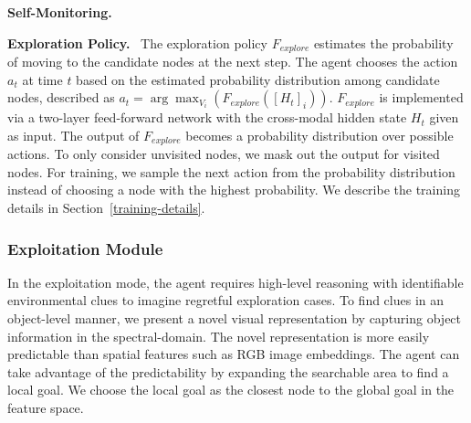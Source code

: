 \documentclass[10pt,twocolumn,letterpaper]{article}
\begin{document}
\noindent\textbf{Self-Monitoring.}
\font=2.5pt

\font=2.2pt
\noindent\textbf{Exploration Policy.}~\label{exploration-policy} The exploration policy $F_{explore}$ estimates the probability of moving to the candidate nodes at the next step. The agent chooses the action $a_t$ at time $t$ based on the estimated probability distribution among candidate nodes, described as $a_t=\arg\max_{V_i} (F_{explore}([H_t]_i))$. $F_{explore}$ is implemented via a two-layer feed-forward network with the cross-modal hidden state $H_t$ given as input. The output of $F_{explore}$ becomes a probability distribution over possible actions. To only consider unvisited nodes, we mask out the output for visited nodes. For training, we sample the next action from the probability distribution instead of choosing a node with the highest probability. We describe the training details in Section~\ref{training-details}.
\font=2.5pt
\vspace{-0.4cm}

\subsubsection{Exploitation Module}\label{sec:exploitation-module}
\vspace{-0.2cm}
In the exploitation mode, the agent requires high-level reasoning with identifiable environmental clues to imagine regretful exploration cases. To find clues in an object-level manner, we present a novel visual representation by capturing object information in the spectral-domain. The novel representation is more easily predictable than spatial features such as RGB image embeddings. The agent can take advantage of the predictability by expanding the searchable area to find a local goal. We choose the local goal as the closest node to the global goal in the feature space.\\
\vspace{-0.3cm}
\end{document}
